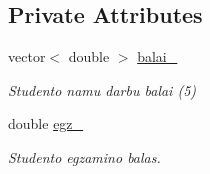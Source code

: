 \subsection*{Private Attributes}
\begin{DoxyCompactItemize}
\item 
\mbox{\label{class_student_a16e8d32dd3362b0019aa58d986afac08}} 
vector$<$ double $>$ \mbox{\hyperlink{class_student_a16e8d32dd3362b0019aa58d986afac08}{balai\+\_\+}}
\begin{DoxyCompactList}\small\item\em Studento namu darbu balai (5) \end{DoxyCompactList}\item 
\mbox{\label{class_student_a122ab4c2ceef32e2f3df785a34a627ff}} 
double \mbox{\hyperlink{class_student_a122ab4c2ceef32e2f3df785a34a627ff}{egz\+\_\+}}
\begin{DoxyCompactList}\small\item\em Studento egzamino balas. \end{DoxyCompactList}\end{DoxyCompactItemize}
